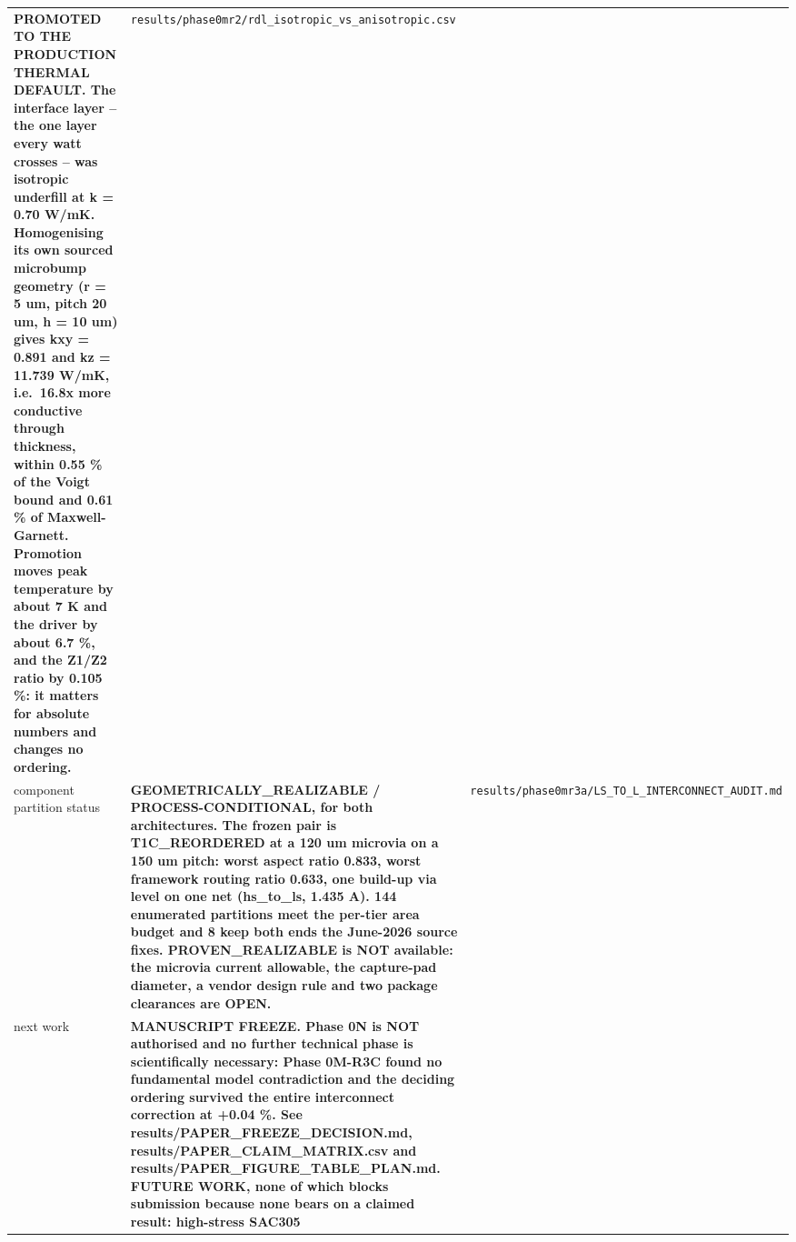 \documentclass[10pt,]{article}
\begin{document}
\begin{longtable}[]{@{}lll@{}}
\begin{minipage}[t]{0.30\columnwidth}
\textbf{PROMOTED TO THE PRODUCTION THERMAL DEFAULT. The interface layer
-- the one layer every watt crosses -- was isotropic underfill at k =
0.70 W/mK. Homogenising its own sourced microbump geometry (r = 5 um,
pitch 20 um, h = 10 um) gives kxy = 0.891 and kz = 11.739 W/mK,
i.e.~16.8x more conductive through thickness, within 0.55 \% of the
Voigt bound and 0.61 \% of Maxwell-Garnett. Promotion moves peak
temperature by about 7 K and the driver by about 6.7 \%, and the Z1/Z2
ratio by 0.105 \%: it matters for absolute numbers and changes no
ordering.}\strut
\end{minipage} & \begin{minipage}[t]{0.30\columnwidth}\raggedright
\texttt{results/phase0mr2/rdl\_isotropic\_vs\_anisotropic.csv}\strut
\end{minipage}\tabularnewline
\begin{minipage}[t]{0.30\columnwidth}\raggedright
component partition status\strut
\end{minipage} & \begin{minipage}[t]{0.30\columnwidth}\raggedright
\textbf{GEOMETRICALLY\_REALIZABLE / PROCESS-CONDITIONAL, for both
architectures. The frozen pair is T1C\_REORDERED at a 120 um microvia on
a 150 um pitch: worst aspect ratio 0.833, worst framework routing ratio
0.633, one build-up via level on one net (hs\_to\_ls, 1.435 A). 144
enumerated partitions meet the per-tier area budget and 8 keep both ends
the June-2026 source fixes. PROVEN\_REALIZABLE is NOT available: the
microvia current allowable, the capture-pad diameter, a vendor design
rule and two package clearances are OPEN.}\strut
\end{minipage} & \begin{minipage}[t]{0.30\columnwidth}\raggedright
\texttt{results/phase0mr3a/LS\_TO\_L\_INTERCONNECT\_AUDIT.md}\strut
\end{minipage}\tabularnewline
\begin{minipage}[t]{0.30\columnwidth}\raggedright
next work\strut
\end{minipage} & \begin{minipage}[t]{0.30\columnwidth}\raggedright
\textbf{MANUSCRIPT FREEZE. Phase 0N is NOT authorised and no further
technical phase is scientifically necessary: Phase 0M-R3C found no
fundamental model contradiction and the deciding ordering survived the
entire interconnect correction at +0.04 \%. See
results/PAPER\_FREEZE\_DECISION.md, results/PAPER\_CLAIM\_MATRIX.csv and
results/PAPER\_FIGURE\_TABLE\_PLAN.md. FUTURE WORK, none of which blocks
submission because none bears on a claimed result: high-stress SAC305
}
\end{minipage}
\end{longtable}
\end{document}
